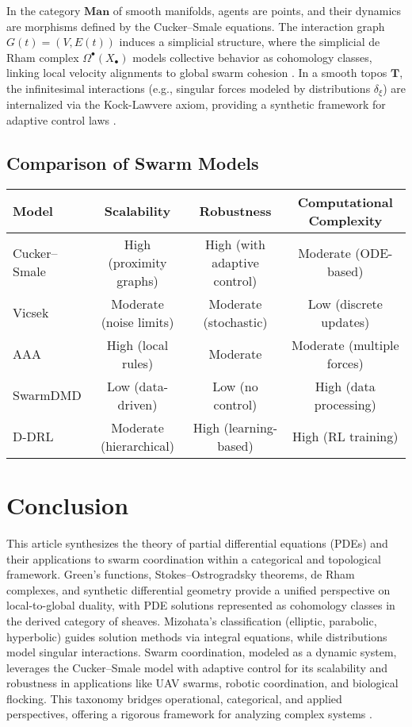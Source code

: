 \documentclass{article}
\theoremstyle{plain}
\newcommand{\cat}[1]{\mathbf{#1}}
\begin{document}
In the category \(\cat{Man}\) of smooth manifolds, agents are points, and their dynamics are
morphisms defined by the Cucker--Smale equations. The interaction graph \(G(t) = (V, E(t))\)
induces a simplicial structure, where the simplicial de Rham complex \(\Omega^\bullet(X_\bullet)\)
models collective behavior as cohomology classes, linking local velocity alignments to global swarm
cohesion \cite{nLab_simplicial_de_Rham}. In a smooth topos \(\cat{T}\), the infinitesimal
interactions (e.g., singular forces modeled by distributions \(\delta_\xi\)) are
internalized via the Kock-Lawvere axiom, providing a synthetic framework for
adaptive control laws \cite{nLab_synthetic_diff_geom}.

\subsection{Comparison of Swarm Models}
\hspace*{-2cm}
\begin{tabular}{lccc}
\hline
\textbf{Model} & \textbf{Scalability} & \textbf{Robustness} & \textbf{Computational Complexity} \\
\hline
Cucker--Smale & High (proximity graphs) & High (with adaptive control) & Moderate (ODE-based) \\
Vicsek & Moderate (noise limits) & Moderate (stochastic) & Low (discrete updates) \\
AAA & High (local rules) & Moderate & Moderate (multiple forces) \\
SwarmDMD & Low (data-driven) & Low (no control) & High (data processing) \\
D-DRL & Moderate (hierarchical) & High (learning-based) & High (RL training) \\
\hline
\end{tabular}

\section{Conclusion}
This article synthesizes the theory of partial differential equations (PDEs)
and their applications to swarm coordination within a categorical and topological framework.
Green's functions, Stokes--Ostrogradsky theorems, de Rham complexes, and synthetic
differential geometry provide a unified perspective on local-to-global duality,
with PDE solutions represented as cohomology classes in the derived category of sheaves.
Mizohata’s classification (elliptic, parabolic, hyperbolic) guides solution methods via
integral equations, while distributions model singular interactions. Swarm coordination,
modeled as a dynamic system, leverages the Cucker--Smale model with adaptive control for
its scalability and robustness in applications like UAV swarms, robotic coordination,
and biological flocking. This taxonomy bridges operational, categorical, and applied
perspectives, offering a rigorous framework for analyzing complex systems \cite{nLab_synthetic_diff_geom, nLab_de_Rham_theorem}.
\end{document}
